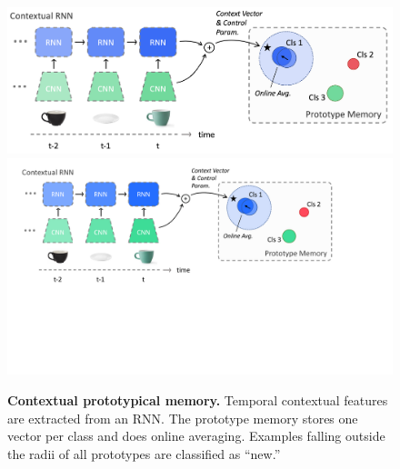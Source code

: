 \begin{figure}[t]
\vspace{-0.7in}
\begin{minipage}[c]{0.5\linewidth}
\centering
\vspace{0.25in}
\iflatexml
\includegraphics[width=6\linewidth]{figures/our_model.png}
\else
\includegraphics[width=\linewidth,trim={0 8cm 4.5cm 0.3cm},clip]{figures/our_model.pdf}
\fi
\end{minipage}
\begin{minipage}[c]{0.5\linewidth}
\caption{\textbf{Contextual prototypical memory.} Temporal contextual features are extracted
from an RNN. The prototype memory stores one vector per class and does online averaging.
Examples falling outside the radii of all prototypes are classified as ``new.'' }
\label{fig:mainmodel}
\end{minipage}
\vspace{-0.25in}
\end{figure}
